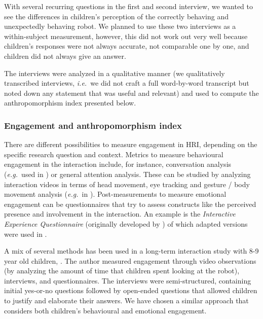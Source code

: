 \documentclass{sig-alternate}
\newcommand{\eg}{{\textit{e.g.~}}}
\newcommand{\ie}{{\textit{i.e.~}}}
\begin{document}
With several recurring questions in the first and second interview, we wanted to
see the differences in children's perception of the correctly behaving and
unexpectedly behaving robot. We planned to use these two interviews as a
within-subject measurement, however, this did not work out very well because
children's responses were not always accurate, not comparable one by one, and
children did not always give an answer.	



The interviews were analyzed in a qualitative manner (we qualitatively
transcribed interviews, \ie we did not craft a full word-by-word transcript but
noted down any statement that was useful and relevant) and used to compute the
anthropomorphism index presented below.

\subsubsection{Engagement and anthropomorphism index}

There are different possibilities to measure engagement in HRI, depending on the
specific research question and context. Metrics to measure behavioural engagement
in the interaction include, for instance, conversation analysis (\eg used in
\cite{short_no_2010}) or general attention analysis. These can be studied by
analyzing interaction videos in terms of head movement, eye tracking and gesture
/ body movement analysis (\eg in \cite{sidner_explorations_2005}).
Post-measurements to measure emotional engagement can be questionnaires that try
to assess constructs like the perceived presence and involvement in the
interaction. An example is the \textit{Interactive Experience Questionnaire}
(originally developed by \cite{lombard_measuring_2000}) of which adapted
versions were used in
\cite{kidd_effect_2004,bainbridge_effect_2008,short_no_2010}.

A mix of several methods has been used in a long-term interaction study with 8-9
year old children, \cite{leite_long-term_2013}. The author measured engagement
through video observations (by analyzing the amount of time that children spent
looking at the robot), interviews, and questionnaires. The interviews were
semi-structured, containing initial yes-or-no questions followed by open-ended
questions that allowed children to justify and elaborate their answers. We have
chosen a similar approach that considers both children's behavioural and
emotional engagement.
\end{document}

